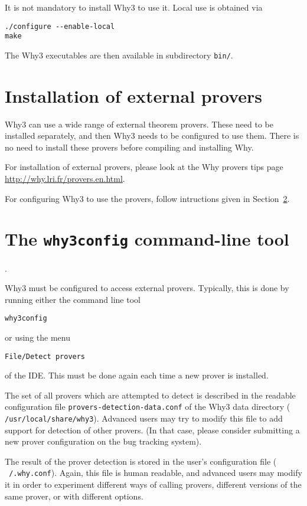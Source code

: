 It is not mandatory to install Why3 to use it. Local use is obtained via
\begin{verbatim}
./configure --enable-local
make
\end{verbatim}
The Why3 executables are then available in subdirectory \texttt{bin/}.

\section{Installation of external provers}

Why3 can use a wide range of external theorem provers. These need to
be installed separately, and then Why3 needs to be configured to use
them. There is no need to install these provers before compiling and
installing Why. 

For installation of external provers, please look at the Why provers
tips page \url{http://why.lri.fr/provers.en.html}.

For configuring Why3 to use the provers, follow intructions given in
Section~\ref{sec:why3config}.

\section{The \texttt{why3config} command-line tool}
\label{sec:why3config}.

Why3 must be configured to access external provers. Typically, this is done
by running either the command line tool
\begin{verbatim}
why3config
\end{verbatim}
or using the menu
\begin{verbatim}
File/Detect provers
\end{verbatim}
of the IDE. This must be done again each time a new prover is installed.

The set of all provers which are attempted to detect is described in
the readable configuration file \texttt{provers-detection-data.conf}
of the Why3 data directory (\eg{}
\texttt{/usr/local/share/why3}). Advanced users may try to modify this
file to add support for detection of other provers. (In that case,
please consider submitting a new prover configuration on the bug
tracking system).

The result of the prover detection is stored in the user's
configuration file (\eg{} \texttt{~/.why.conf}). Again, this file is
human readable, and advanced users may modify it in order to
experiment different ways of calling provers, \eg{} different versions
of the same prover, or with different options.

